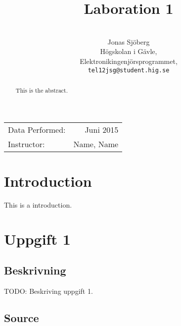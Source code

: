 \documentclass[11pt,a4paper]{article}
\title{Laboration 1}
\author{\\
  Jonas Sjöberg\\
  Högskolan i Gävle,\\
  Elektronikingenjörsprogrammet,\\
  \texttt{tel12jsg@student.hig.se}}
\date{}
\begin{document}
\maketitle

\begin{center}
\begin{tabular}{l r}
    Data Performed: & Juni 2015 \\
    Instructor: & Name, Name
\end{tabular}
\end{center}

\begin{abstract}
This is the abstract.
\end{abstract}

\newpage

{
\setcounter{tocdepth}{3}
\tableofcontents
}

\newpage

\section{Introduction}\label{setup}
This is a introduction.

\section{Uppgift 1}\label{uppgift-1}

\subsection{Beskrivning}
TODO: Beskriving uppgift 1.

\subsection{Source}\label{subsection-1}

\inputminted[]{java}{../src/Lab1Uppg01.java}
\end{document}
